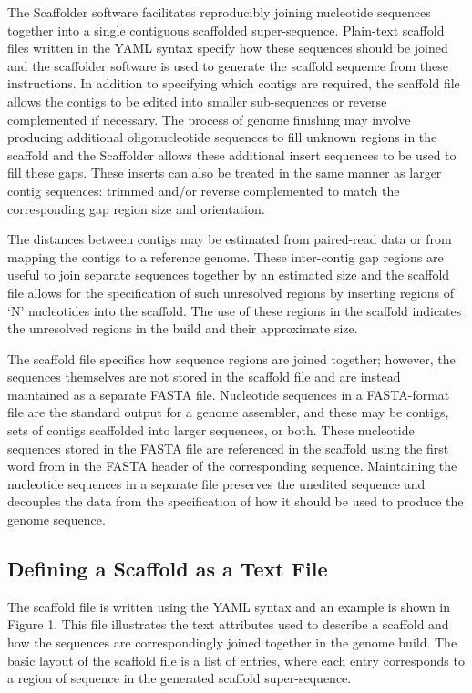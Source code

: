 \documentclass[10pt]{bmc_article}
\newenvironment{bmcformat}{\begin{raggedright}\baselineskip20pt\sloppy\setboolean{publ}{false}}{\end{raggedright}\baselineskip20pt\sloppy}
\begin{document}
\begin{bmcformat}
The Scaffolder software facilitates reproducibly joining nucleotide sequences
together into a single contiguous scaffolded super-sequence. Plain-text
scaffold files written in the YAML syntax specify how these sequences should
be joined and the scaffolder software is used to generate the scaffold
sequence from these instructions. In addition to specifying which contigs are
required, the scaffold file allows the contigs to be edited into smaller
sub-sequences or reverse complemented if necessary. The process of genome
finishing may involve producing additional oligonucleotide sequences to fill
unknown regions in the scaffold and the Scaffolder allows these additional
insert sequences to be used to fill these gaps. These inserts can also be
treated in the same manner as larger contig sequences: trimmed and/or reverse
complemented to match the corresponding gap region size and orientation. \pb

The distances between contigs may be estimated from paired-read data or from
mapping the contigs to a reference genome. These inter-contig gap regions are
useful to join separate sequences together by an estimated size and the
scaffold file allows for the specification of such unresolved regions by
inserting regions of `N' nucleotides into the scaffold. The use of these
regions in the scaffold indicates the unresolved regions in the build and their
approximate size. \pb

The scaffold file specifies how sequence regions are joined together; however,
the sequences themselves are not stored in the scaffold file and are instead
maintained as a separate FASTA file. Nucleotide sequences in a FASTA-format
file are the standard output for a genome assembler, and these may be contigs,
sets of contigs scaffolded into larger sequences, or both. These nucleotide
sequences stored in the FASTA file are referenced in the scaffold using the
first word from in the FASTA header of the corresponding sequence. Maintaining
the nucleotide sequences in a separate file preserves the unedited sequence
and decouples the data from the specification of how it should be used to
produce the genome sequence. \pb

\subsection*{Defining a Scaffold as a Text File} %

The scaffold file is written using the YAML syntax and an example is shown in
Figure 1. This file illustrates the text attributes used to describe
a scaffold and how the sequences are correspondingly joined together in the
genome build. The basic layout of the scaffold file is a list of entries,
where each entry corresponds to a region of sequence in the generated scaffold
super-sequence.  \pb


\end{bmcformat}
\end{document}
